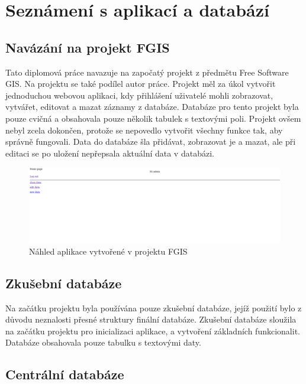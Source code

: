 \chapter{Seznámení s aplikací a databází}
\label{3-seznameni-s-aplikaci-a-databazi}

\section{Navázání na projekt FGIS}

Tato diplomová práce navazuje na započatý projekt z předmětu Free
Software GIS. Na projektu se také podílel autor práce. 
Projekt měl za úkol vytvořit jednoduchou webovou aplikaci, kdy
přihlášení uživatelé mohli zobrazovat, vytvářet, editovat a mazat záznamy
z databáze. Databáze pro tento projekt byla pouze cvičná a obsahovala
pouze několik tabulek s textovými poli. Projekt ovšem nebyl zcela
dokončen, protože se nepovedlo vytvořit všechny funkce tak, aby
správně fungovali. Data do databáze šla přidávat, zobrazovat je a 
mazat, ale při editaci se po uložení nepřepsala aktuální data v
databázi.

\begin{figure}[H] \centering
    \includegraphics[width=400pt]{./pictures/4-nahled-menu-fgis.PNG}
    \caption[Náhled aplikace vytvořené v projektu FGIS]{Náhled aplikace vytvořené v projektu FGIS}
	\label{fig:Náhled aplikace}              
\end{figure}
 
 \section{Zkušební databáze}
 
Na začátku projektu byla používána pouze zkušební databáze, jejíž použití 
bylo z důvodu neznalosti přesné struktury finální databáze. Zkušební databáze 
sloužila na začátku projektu pro inicializaci aplikace, a vytvoření základních 
funkcionalit. Databáze obsahovala pouze tabulku s textovými daty.

 \newpage

\section{Centrální databáze}

